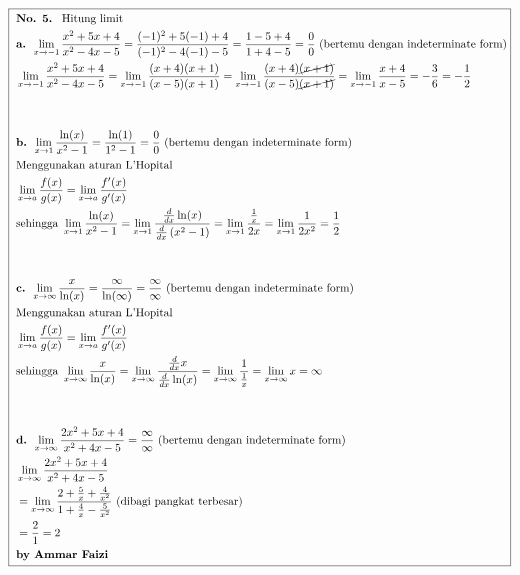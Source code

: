 \documentclass[13pt]{article}
\begin{document}
\begin{fleqn}[4em]
\begin{align*}
\boxed{\begin{aligned}
  & \textbf{No. 5. } \text{ Hitung limit } \\
  & \textbf{a. } \lim_{x \to -1} \frac{x^2 + 5x + 4}{x^2 - 4x -5}
    = \frac{(-1)^2 + 5(-1) + 4}{(-1)^2 - 4(-1) -5}
    = \frac{1 - 5 + 4}{1 + 4 -5}
    = \frac{0}{0} \text{ (bertemu dengan indeterminate form)} \\
  & \lim_{x \to -1} \frac{x^2 + 5x + 4}{x^2 - 4x -5}
    = \lim_{x \to -1} \frac{(x + 4)(x + 1)}{(x - 5)(x + 1)}
    = \lim_{x \to -1} \frac{(x + 4)\cancel{(x + 1)}}{(x - 5)\cancel{(x + 1)}}
    = \lim_{x \to -1} \frac{x + 4}{x - 5}
    = -\frac{3}{6} = -\frac{1}{2} \\ ~ \\ ~ \\
  & \textbf{b. } \lim_{x \to 1} \frac{\ln(x)}{x^2 - 1}
    = \frac{\ln(1)}{1^2 - 1}
    = \frac{0}{0} \text{ (bertemu dengan indeterminate form)} \\
  & \text{Menggunakan aturan L'Hopital} \\
  & \lim_{x \to a} \frac{f(x)}{g(x)} = \lim_{x \to a} \frac{f'(x)}{g'(x)} \\
  & \text{sehingga } \lim_{x \to 1} \frac{\ln(x)}{x^2 - 1}
    = \lim_{x \to 1} \frac{\frac{d}{dx} \ln(x)}{\frac{d}{dx}\left(x^2 - 1\right)}
    = \lim_{x \to 1} \frac{\frac{1}{x}}{2x}
    = \lim_{x \to 1} \frac{1}{2x^2}
    = \frac{1}{2} \\ ~ \\ ~ \\
  & \textbf{c. } \lim_{x \to \infty} \frac{x}{\ln(x)}
    = \frac{\infty}{\ln(\infty)}
    = \frac{\infty}{\infty} \text{ (bertemu dengan indeterminate form)} \\
  & \text{Menggunakan aturan L'Hopital} \\
  & \lim_{x \to a} \frac{f(x)}{g(x)} = \lim_{x \to a} \frac{f'(x)}{g'(x)} \\
  & \text{sehingga } \lim_{x \to \infty} \frac{x}{\ln(x)}
    = \lim_{x \to \infty} \frac{\frac{d}{dx}x}{\frac{d}{dx}\ln(x)}
    = \lim_{x \to \infty} \frac{1}{\frac{1}{x}}
    = \lim_{x \to \infty} x
    = \infty  \\ ~ \\ ~ \\
  & \textbf{d. } \lim_{x \to \infty} \frac{2x^2 + 5x + 4}{x^2 + 4x - 5}
    = \frac{\infty}{\infty} \text{ (bertemu dengan indeterminate form)} \\
  & \lim_{x \to \infty} \frac{2x^2 + 5x + 4}{x^2 + 4x - 5} \\
  &  = \lim_{x\to \infty}\frac{2+\frac{5}{x}+\frac{4}{x^2}}{1+\frac{4}{x}-\frac{5}{x^2}} \text{ (dibagi pangkat terbesar)} \\
  &  = \frac{2}{1} = 2
  \\ & \textbf{by Ammar Faizi}
\end{aligned}}
\end{align*}

\end{fleqn}
\end{document}
